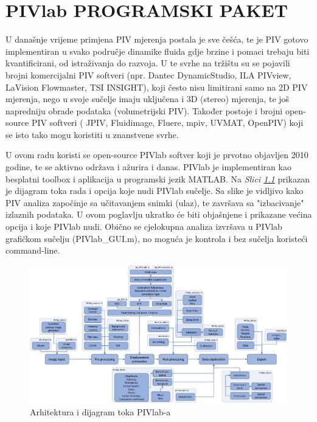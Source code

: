 \chapter{PIVlab PROGRAMSKI PAKET}
\label{chap:Poglavlje5}

U današnje vrijeme primjena PIV mjerenja postala je sve češća, te je PIV gotovo implementiran u svako područje dinamike fluida gdje brzine i pomaci trebaju biti kvantificirani, od istraživanja do razvoja. U te svrhe na tržištu su se pojavili brojni komercijalni PIV softveri (npr. Dantec DynamicStudio, ILA PIVview, LaVision Flowmaster, TSI INSIGHT), koji često nisu limitirani samo na 2D PIV mjerenja, nego u svoje sučelje imaju uključena i 3D (stereo) mjerenja, te još napredniju obrade podataka (volumetrijski PIV). Također postoje i brojni open-source PIV softveri ( JPIV\cite{jpiv}, Fluidimage\cite{fluidimage}, Fluere\cite{fluere}, mpiv\cite{mpiv}, UVMAT\cite{uvmat}, OpenPIV\cite{openpiv}) koji se isto tako mogu koristiti u znanstvene svrhe.
\par
U ovom radu koristi se open-source PIVlab\cite{thielicke2021PIVinMatLab} softver koji je prvotno objavljen 2010 godine, te se aktivno održava i ažurira i danas.  PIVlab je implementiran kao besplatni toolbox i aplikacija u programski jezik MATLAB. Na \textit{Slici \ref{sl:5.1}} prikazan je dijagram toka rada i opcija koje nudi PIVlab sučelje. Sa slike je vidljivo kako PIV analiza započinje sa učitavanjem snimki (ulaz), te završava sa "izbacivanje" izlaznih podataka. U ovom poglavlju ukratko će biti objašnjene i prikazane većina opcija i koje PIVlab nudi. Obično se cjelokupna analiza izvršava u PIVlab grafičkom sučelju (PIVlab\_GUI.m), no moguća je kontrola i bez sučelja koristeći command-line.
\begin{figure}[h]  
	\centering
	\includegraphics[width=16.6cm]{./5_PIVlab/slika5_1.jpg} 
	\caption{Arhitektura i dijagram toka PIVlab-a \cite{thielicke2021PIVinMatLab}}
	\label{sl:5.1}
\end{figure}
